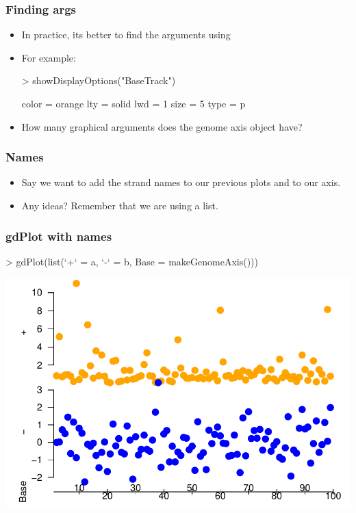 \begin{frame}
  \frametitle{Finding args}
  \begin{itemize}
  \item In practice, its better to find the arguments using 
  \item For example:
\begin{Schunk}
\begin{Sinput}
> showDisplayOptions("BaseTrack")
\end{Sinput}
\begin{Soutput}
color  =  orange 
lty  =  solid 
lwd  =  1 
size  =  5 
type  =  p 
\end{Soutput}
\end{Schunk}
  \item How many graphical arguments does the genome axis object have?
  \end{itemize}
\end{frame}

\begin{frame}[allowframebreaks]
  \frametitle{Names}
  \begin{itemize}
  \item Say we want to add the strand names to our previous plots and to our axis.
  \item Any ideas? Remember that we are using a list.
  \end{itemize}
\end{frame}

\begin{frame}
  \frametitle{gdPlot with names}
\begin{Schunk}
\begin{Sinput}
> gdPlot(list(`+` = a, `-` = b, Base = makeGenomeAxis()))
\end{Sinput}
\end{Schunk}
\includegraphics{plots/fig-016}
\end{frame}

